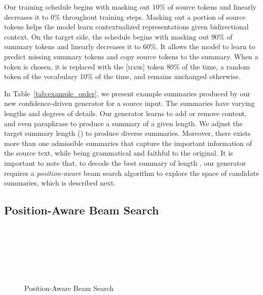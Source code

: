 \documentclass[11pt]{article}
\begin{document}
Our training schedule begins with masking out 10\% of source tokens and linearly decreases it to 0\% throughout training steps.
Masking out a portion of source tokens helps the model learn contextualized representations given bidirectional context.
On the target side, the schedule begins with masking out 90\% of summary tokens and linearly decreases it to 60\%. 
It allows the model to learn to predict missing summary tokens and copy source tokens to the summary.
When a token is chosen, it is replaced with the \textsc{[mask]} token 80\% of the time, a random token of the vocabulary 10\% of the time, and remains unchanged otherwise.


In Table~\ref{tab:example_order}, we present example summaries produced by our new confidence-driven generator for a source input.
The summaries have varying lengths and degrees of details.
Our generator learns to add or remove content, and even paraphrase to produce a summary of a given length.
We adjust the target summary length () to produce diverse summaries.
Moreover, there exists more than one admissible summaries that capture the important information of the source text, while being grammatical and faithful to the original. 
It is important to note that, to decode the best summary of length , our generator requires a \emph{position-aware} beam search algorithm to explore the space of candidate summaries, which is described next.


\subsection{Position-Aware Beam Search}
\label{sec:decode}


\begin{figure}
\centering
\begin{minipage}[h]{0.48\textwidth}
\begin{algorithm}[H]
\caption{Position-Aware Beam Search}\label{alg:Beam}
\begin{algorithmic}[1]
\smaller
{}\\
\Comment{\textcolor{darkblue}{ is the summary length and  is the beam size.}}
\State  \quad\Comment{\textcolor{darkblue}{Initial summary.}}
\State  \,\,\,\Comment{\textcolor{darkblue}{A binary mask of  positions.}}
\State  \,\,\;\Comment{\textcolor{darkblue}{A priority queue.}}
\For{}
    \State 
    \For{}
        \State \\
        \quad\quad\quad\quad\,\,\Comment{\textcolor{darkblue}{Estimate token probabilities.}}
        \State  
        \State \\ \quad\quad\quad\quad\,\,\Comment{\textcolor{darkblue}{Record -best tokens and positions.}}
        \For {}
            \State 
            \State 
            \State 
            \State 
        \EndFor
    \EndFor
    \State 
\EndFor\\
\Return  \,\,\Comment{\textcolor{darkblue}{The best summary of length .}}
\EndProcedure
\end{algorithmic}
\label{alg:beam_search}
\end{algorithm}
\end{minipage}
\end{figure}
\end{document}
